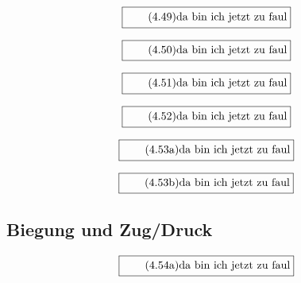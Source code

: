 \documentclass[11pt]{article}
\newcommand{\1}{ {\mathds{1}} }
\begin{document}
		\begin{equation}
			\boxed{
				\tag{4.49}
				\begin{split}
					\text{da bin ich jetzt zu faul}
				\end{split}
			}
		\end{equation}
		
		\begin{equation}
			\boxed{
				\tag{4.50}
				\begin{split}
					\text{da bin ich jetzt zu faul}
				\end{split}
			}
		\end{equation}
		
		\begin{equation}
			\boxed{
				\tag{4.51}
				\begin{split}
					\text{da bin ich jetzt zu faul}
				\end{split}
			}
		\end{equation}
		
		\begin{equation}
			\boxed{
				\tag{4.52}
				\begin{split}
					\text{da bin ich jetzt zu faul}
				\end{split}
			}
		\end{equation}

		\begin{equation}
			\boxed{
				\tag{4.53a}
				\begin{split}
					\text{da bin ich jetzt zu faul}
				\end{split}
			}
		\end{equation}

		\begin{equation}
			\boxed{
				\tag{4.53b}
				\begin{split}
					\text{da bin ich jetzt zu faul}
				\end{split}
			}
		\end{equation}

		\subsection{Biegung und Zug/Druck}

		\begin{equation}
			\boxed{
				\tag{4.54a}
				\begin{split}
					\text{da bin ich jetzt zu faul}
				\end{split}
			}
		\end{equation}
		
\end{document}
